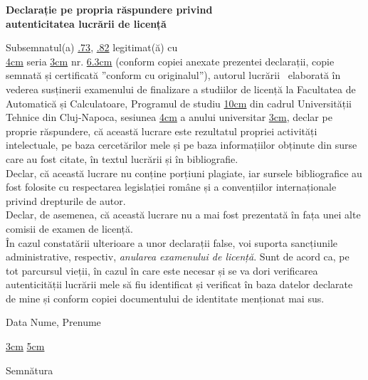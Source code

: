 \begin{center}
	{\bf Declarație pe propria răspundere privind\\ 
		autenticitatea lucrării de licență}
\end{center}
\vspace{1cm}

\begin{minipage}{\linewidth}
	Subsemnatul(a) \uline{.73\linewidth},
	\uline{.82\linewidth}
	legitimat(ă) cu\\ \uline{4cm} seria \uline{3cm} nr. \uline{6.3cm}
	(conform copiei anexate prezentei declarații, copie semnată și certificată ”conform cu originalul”), autorul lucrării\
	\uline{\linewidth}
	\uline{\linewidth}
	\uline{\linewidth}
	elaborată în vederea susținerii examenului de finalizare a studiilor de licență la Facultatea de Automatică și Calculatoare, Programul de studiu \uline{10cm} din cadrul Universității Tehnice din Cluj-Napoca, sesiunea \uline{4cm} a anului universitar \uline{3cm}, declar pe proprie răspundere, că această lucrare este rezultatul propriei activități intelectuale, pe baza cercetărilor mele și pe baza informațiilor obținute din surse care au fost citate, în textul lucrării și în bibliografie.\\
	Declar, că această lucrare nu conține porțiuni plagiate, iar sursele bibliografice au fost folosite cu respectarea legislației române și a convențiilor internaționale privind drepturile de autor.\\
	Declar, de asemenea, că această lucrare nu a mai fost prezentată în fața unei alte comisii de examen de licență.\\
	În cazul constatării ulterioare a unor declarații false, voi suporta sancțiunile administrative, respectiv, \emph{anularea examenului de licență}.
	Sunt de acord ca, pe tot parcursul vieții, în cazul în care este necesar și se va dori verificarea autenticității lucrării mele să fiu identificat și verificat în baza datelor declarate de mine și conform copiei documentului de identitate menționat mai sus.
\end{minipage}
\vspace{1.5cm}

Data \hspace{8cm} Nume, Prenume

\vspace{0.5cm}

\uline{3cm} \hspace{5cm} \uline{5cm}

\vspace{1cm}
\hspace{9.4cm}Semnătura
\newpage
